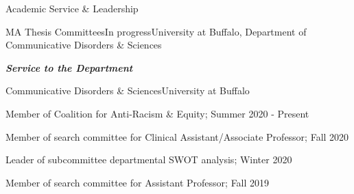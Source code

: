 \documentclass{resume} %
\begin{document}
\begin{rSection}{Academic Service \& Leadership}
\begin{rSubsection}{MA Thesis Committees}{In progress}{University at Buffalo, Department of Communicative Disorders \& Sciences}{}
\bigskip
\begin{center}
	{\bf \emph{Service to the Department}}\\
\end{center}



\begin{rSubsection}{Communicative Disorders \& Sciences}{}{University at Buffalo}{}
	\item Member of Coalition for Anti-Racism \& Equity; Summer 2020 - Present
	\item Member of search committee for Clinical Assistant/Associate Professor; Fall 2020
	\item Leader of subcommittee departmental SWOT analysis; Winter 2020
	\item Member of search committee for Assistant Professor; Fall 2019
\end{rSubsection}

%	
%
%
%	


\end{rSubsection}
\end{rSection}
\end{document}
